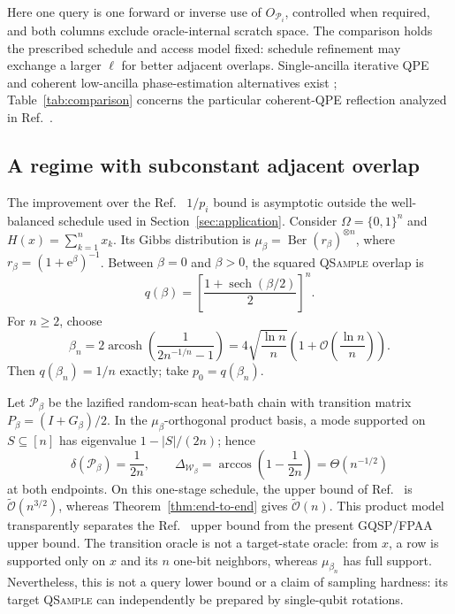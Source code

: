 \documentclass[10pt,conference]{IEEEtran}
\theoremstyle{plain}
\theoremstyle{remark}
\begin{document}
\noindent
Here one query is one forward or inverse use of \(O_{\mathcal P_i}\),
controlled when required, and both columns exclude
oracle-internal scratch space.  The comparison holds the prescribed
schedule and access model fixed: schedule refinement may exchange a
larger \(\ell\) for better adjacent overlaps.  Single-ancilla
iterative QPE and coherent low-ancilla phase-estimation alternatives
exist \cite{Dobsicek2007,Rall2021}; Table~\ref{tab:comparison} concerns
the particular coherent-QPE reflection analyzed in
Ref.~\cite{wocjan_speed-up_2008}.

\subsection{A regime with subconstant adjacent overlap}
\label{sec:subconstant-overlap}
The improvement over the Ref.~\cite{wocjan_speed-up_2008}
\(1/p_i\) bound is asymptotic outside the well-balanced schedule used
in Section~\ref{sec:application}.  Consider
\(\Omega=\{0,1\}^n\) and
\(H(x)=\sum_{k=1}^n x_k\).  Its Gibbs distribution is
\(\mu_\beta=\operatorname{Ber}(r_\beta)^{\otimes n}\), where
\(r_\beta=(1+\mathrm e^\beta)^{-1}\).  Between \(\beta=0\) and
\(\beta>0\), the squared \textsc{QSample} overlap is
\begin{equation}
\label{eq:product-gibbs-overlap}
q(\beta)=
\left[\frac{1+\operatorname{sech}(\beta/2)}{2}\right]^n .
\end{equation}
For \(n\geq2\), choose
\begin{equation}
\label{eq:product-gibbs-beta}
\beta_n=
2\operatorname{arcosh}\!\left(
\frac{1}{2n^{-1/n}-1}\right)
=4\sqrt{\frac{\ln n}{n}}\left(
1+\mathcal O\!\left(\frac{\ln n}{n}\right)\right).
\end{equation}
Then \(q(\beta_n)=1/n\) exactly; take \(p_0=q(\beta_n)\).

Let \(\mathcal P_\beta\) be the lazified random-scan heat-bath chain
with transition matrix \(P_\beta=(I+G_\beta)/2\).  In the
\(\mu_\beta\)-orthogonal product basis, a mode
supported on \(S\subseteq[n]\) has eigenvalue
\(1-|S|/(2n)\); hence
\begin{equation}
\delta(\mathcal P_\beta)=\frac1{2n},\qquad
\Delta_{\mathcal W_\beta}
=\arccos\!\left(1-\frac1{2n}\right)
=\Theta(n^{-1/2})
\label{eq:product-gibbs-gap}
\end{equation}
at both endpoints.  On this one-stage schedule, the upper bound of
Ref.~\cite{wocjan_speed-up_2008} is
\(\widetilde{\mathcal O}(n^{3/2})\), whereas
Theorem~\ref{thm:end-to-end} gives
\(\widetilde{\mathcal O}(n)\).  This product model transparently
separates the Ref.~\cite{wocjan_speed-up_2008} upper bound from the
present GQSP/FPAA upper bound.  The transition oracle
is not a target-state oracle: from \(x\), a row is supported only on
\(x\) and its \(n\) one-bit neighbors, whereas \(\mu_{\beta_n}\) has
full support.  Nevertheless, this is not a query lower bound or a
claim of sampling hardness: its target
\textsc{QSample} can independently be prepared by single-qubit
rotations.
\end{document}
